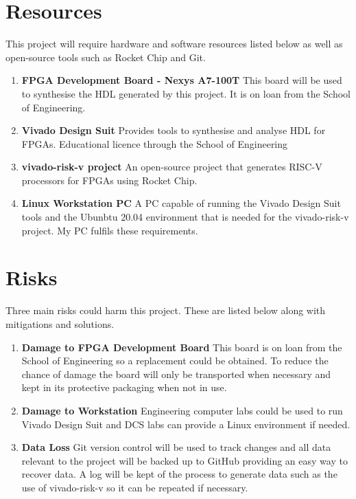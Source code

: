 \documentclass[a4paper,fleqn,12pt]{article}
\begin{document}
	\section{Resources}
	This project will require hardware and software resources listed below as well as open-source tools such as Rocket Chip and Git.
	\begin{enumerate}
		\item \textbf{FPGA Development Board - Nexys A7-100T} \newline
		This board will be used to synthesise the HDL generated by this project. It is on loan from the School of Engineering.
		\item \textbf{Vivado Design Suit} \newline
		Provides tools to synthesise and analyse HDL for FPGAs. Educational licence through the School of Engineering
		\item \textbf{vivado-risk-v project} \citep{vivado-risk-v} \newline
		An open-source project that generates RISC-V processors for FPGAs using Rocket Chip.
		\item \textbf{Linux Workstation PC} \newline
		A PC capable of running the Vivado Design Suit tools and the Ubunbtu 20.04 environment that is needed for the vivado-risk-v project. My PC fulfils these requirements.
	\end{enumerate}
	
	\section{Risks}
	Three main risks could harm this project. These are listed below along with mitigations and solutions.
	\begin{enumerate}
		\item \textbf{Damage to FPGA Development Board} \newline
		This board is on loan from the School of Engineering so a replacement could be obtained. To reduce the chance of damage the board will only be transported when necessary and kept in its protective packaging when not in use.
		\item \textbf{Damage to Workstation} \newline
		Engineering computer labs could be used to run Vivado Design Suit and DCS labs can provide a Linux environment if needed.
		\item \textbf{Data Loss} \newline
		Git version control will be used to track changes and all data relevant to the project will be backed up to GitHub providing an easy way to recover data. A log will be kept of the process to generate data such as the use of vivado-risk-v so it can be repeated if necessary.
	\end{enumerate}
	
\end{document}
